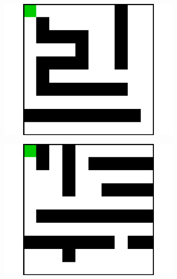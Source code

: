 \documentclass{article}
\begin{document}
\begin{figure}[t]
\begin{subfigure}[t]{0.18\textwidth}
    \includegraphics[width=\textwidth]{images/maze/maze7.pdf}
    \caption{}
  \end{subfigure}
  \begin{subfigure}[t]{0.18\textwidth}
    \includegraphics[width=\textwidth]{images/maze/maze8.pdf}
    \caption{}
  \end{subfigure}
  \begin{subfigure}[t]{0.18\textwidth}

\end{subfigure}
\end{figure}
\end{document}
